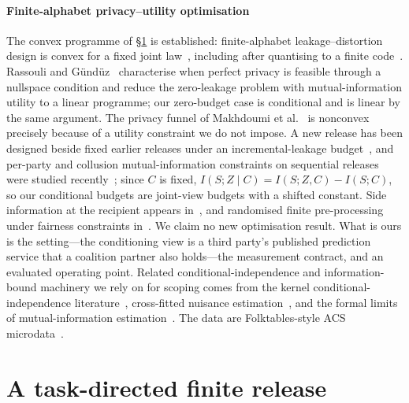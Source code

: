 \documentclass[conference]{IEEEtran}
\begin{document}
\paragraph{Finite-alphabet privacy--utility optimisation} The convex programme of \S\ref{sec:method} is
established: finite-alphabet leakage--distortion design is convex for a fixed joint
law~\cite{calmon2012privacy}, including after quantising to a finite code~\cite{salamatian2015managing}.
Rassouli and G\"und\"uz~\cite{rassouli2021perfect} characterise when perfect privacy is feasible through a
nullspace condition and reduce the zero-leakage problem with mutual-information utility to a linear
programme; our zero-budget case is conditional and is linear by the same argument. The privacy funnel of
Makhdoumi et al.~\cite{makhdoumi2014funnel} is nonconvex precisely because of a utility constraint we do
not impose. A new release has been designed beside fixed earlier releases under an incremental-leakage
budget~\cite{erdogdu2015continual}, and per-party and collusion mutual-information constraints on
sequential releases were studied recently~\cite{taylor2026collusion}; since $C$ is fixed,
$I(S;Z\mid C)=I(S;Z,C)-I(S;C)$, so our conditional budgets are joint-view budgets with a shifted
constant. Side information at the recipient appears in~\cite{sankar2013utility,liao2019sideinfo}, and
randomised finite pre-processing under fairness constraints in~\cite{calmon2017optimized}. We claim no new
optimisation result. What is ours is the setting---the conditioning view is a third party's published
prediction service that a coalition partner also holds---the measurement contract, and an evaluated
operating point. Related conditional-independence and information-bound machinery we rely on for scoping
comes from the kernel conditional-independence literature~\cite{zhang2011kci,strobl2019rcit}, cross-fitted
nuisance estimation~\cite{chernozhukov2016dml}, and the formal limits of mutual-information
estimation~\cite{mcallester2020formal}. The data are Folktables-style ACS microdata~\cite{ding2021retiring}.

\section{A task-directed finite release}
\label{sec:method}
\end{document}

